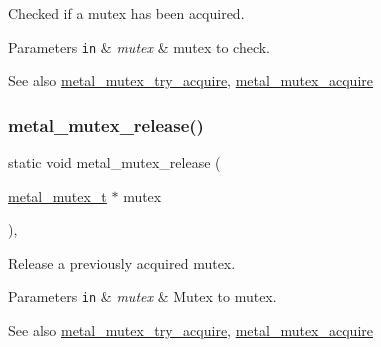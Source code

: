 Checked if a mutex has been acquired. 


\begin{DoxyParams}[1]{Parameters}
\mbox{\tt in}  & {\em mutex} & mutex to check. \\
\hline
\end{DoxyParams}
\begin{DoxySeeAlso}{See also}
\hyperlink{group__mutex_ga290699ccc31f77849ffc21e779795361}{metal\+\_\+mutex\+\_\+try\+\_\+acquire}, \hyperlink{group__mutex_ga2ac9a9458e5d2b2d666c0a2c02e68bba}{metal\+\_\+mutex\+\_\+acquire} 
\end{DoxySeeAlso}
\mbox{\label{group__mutex_ga48df0681ac127c8d268845b57e8016b8}} 
\subsubsection{\texorpdfstring{metal\+\_\+mutex\+\_\+release()}{metal\_mutex\_release()}}
{\footnotesize\ttfamily static void metal\+\_\+mutex\+\_\+release (\begin{DoxyParamCaption}\item[{\hyperlink{structmetal__mutex__t}{metal\+\_\+mutex\+\_\+t} $\ast$}]{mutex }\end{DoxyParamCaption})\hspace{0.3cm}{\ttfamily [inline]}, {\ttfamily [static]}}



Release a previously acquired mutex. 


\begin{DoxyParams}[1]{Parameters}
\mbox{\tt in}  & {\em mutex} & Mutex to mutex. \\
\hline
\end{DoxyParams}
\begin{DoxySeeAlso}{See also}
\hyperlink{group__mutex_ga290699ccc31f77849ffc21e779795361}{metal\+\_\+mutex\+\_\+try\+\_\+acquire}, \hyperlink{group__mutex_ga2ac9a9458e5d2b2d666c0a2c02e68bba}{metal\+\_\+mutex\+\_\+acquire} 
\end{DoxySeeAlso}
\mbox{\label{group__mutex_ga290699ccc31f77849ffc21e779795361}} 
